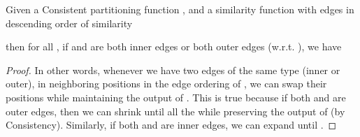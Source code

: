 \documentclass[twoside,11pt]{article}
\begin{document}
\begin{lemma} \label{swap}
Given a Consistent partitioning function , and a similarity function  with edges in descending order of similarity

then for all , if  and  are both inner edges or both outer edges (w.r.t. ), we have

\end{lemma}
\begin{proof}
In other words, whenever we have two edges of the same type (inner or outer), in neighboring positions in the edge ordering of , we can swap their positions while maintaining the output of . This is true because if both  and  are outer edges, then we can shrink  until  all the while preserving the output of  (by Consistency). Similarly, if both  and  are inner edges, we can expand  until .
\end{proof}
\end{document}
